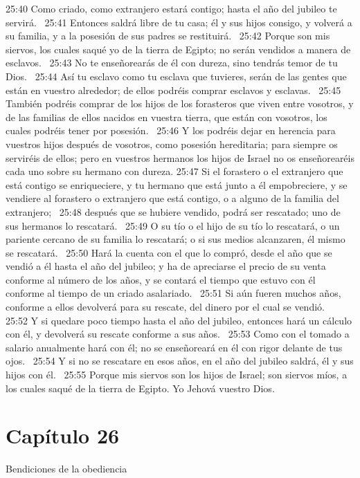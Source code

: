 25:40 Como criado, como extranjero estará contigo; hasta el año del jubileo te servirá.  
25:41 Entonces saldrá libre de tu casa; él y sus hijos consigo, y volverá a su familia, y a la posesión de sus padres se restituirá.  
25:42 Porque son mis siervos, los cuales saqué yo de la tierra de Egipto; no serán vendidos a manera de esclavos.  
25:43 No te enseñorearás de él con dureza, sino tendrás temor de tu Dios.  
25:44 Así tu esclavo como tu esclava que tuvieres, serán de las gentes que están en vuestro alrededor; de ellos podréis comprar esclavos y esclavas.  
25:45 También podréis comprar de los hijos de los forasteros que viven entre vosotros, y de las familias de ellos nacidos en vuestra tierra, que están con vosotros, los cuales podréis tener por posesión.  
25:46 Y los podréis dejar en herencia para vuestros hijos después de vosotros, como posesión hereditaria; para siempre os serviréis de ellos; pero en vuestros hermanos los hijos de Israel no os enseñorearéis cada uno sobre su hermano con dureza. 
25:47 Si el forastero o el extranjero que está contigo se enriqueciere, y tu hermano que está junto a él empobreciere, y se vendiere al forastero o extranjero que está contigo, o a alguno de la familia del extranjero;  
25:48 después que se hubiere vendido, podrá ser rescatado; uno de sus hermanos lo rescatará.  
25:49 O su tío o el hijo de su tío lo rescatará, o un pariente cercano de su familia lo rescatará; o si sus medios alcanzaren, él mismo se rescatará.  
25:50 Hará la cuenta con el que lo compró, desde el año que se vendió a él hasta el año del jubileo; y ha de apreciarse el precio de su venta conforme al número de los años, y se contará el tiempo que estuvo con él conforme al tiempo de un criado asalariado.  
25:51 Si aún fueren muchos años, conforme a ellos devolverá para su rescate, del dinero por el cual se vendió.  
25:52 Y si quedare poco tiempo hasta el año del jubileo, entonces hará un cálculo con él, y devolverá su rescate conforme a sus años.  
25:53 Como con el tomado a salario anualmente hará con él; no se enseñoreará en él con rigor delante de tus ojos.  
25:54 Y si no se rescatare en esos años, en el año del jubileo saldrá, él y sus hijos con él.  
25:55 Porque mis siervos son los hijos de Israel; son siervos míos, a los cuales saqué de la tierra de Egipto. Yo Jehová vuestro Dios.  
\section*{Capítulo 26}
Bendiciones de la obediencia   

